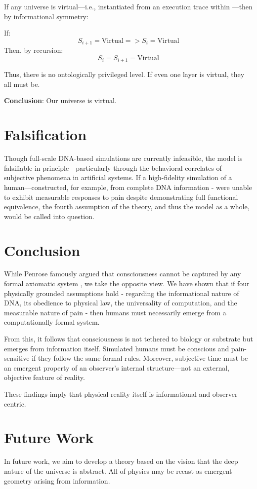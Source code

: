 \documentclass[11pt]{article}
\begin{document}
If any universe  is virtual—i.e., instantiated from an execution trace within —then by informational symmetry:

If:
\[
  S_{i+1} = \text{Virtual} => S_{i} = \text{Virtual}
\]
Then, by recursion:
\[
  S_i = S_{i+1} = \text{Virtual}
\]

Thus, there is no ontologically privileged level. If even one layer is virtual, they all must be.

\textbf{Conclusion}: Our universe is virtual.



\section{Falsification}

Though full-scale DNA-based simulations are currently infeasible, the model is falsifiable in principle—particularly through the behavioral correlates of subjective phenomena in artificial systems. If a high-fidelity simulation of a human—constructed, for example,
from complete DNA information - were unable to exhibit measurable responses to pain despite demonstrating full functional
equivalence, the fourth assumption of the theory, and thus the model as a whole, would be called into question.



\section{Conclusion}

While Penrose \cite{penrose1989emperor} famously argued that consciousness cannot be captured by any formal axiomatic system , we take the opposite view. We have shown that if four physically grounded assumptions hold - regarding the informational nature of DNA, its obedience to physical law, the universality of computation, and the measurable nature of pain - then humans must necessarily emerge from a computationally formal system.

From this, it follows that consciousness is not tethered to biology or substrate but emerges from information itself. Simulated humans must be conscious and pain-sensitive if they follow the same formal rules. Moreover, subjective time must be an emergent property of an observer’s internal structure—not an external, objective feature of reality.

These findings imply that physical reality itself is informational and observer centric.


\section*{Future Work}


In future work, we aim to develop a theory based on the vision that the deep nature of the universe is abstract. All of physics may be recast as emergent geometry arising from information.
\end{document}

